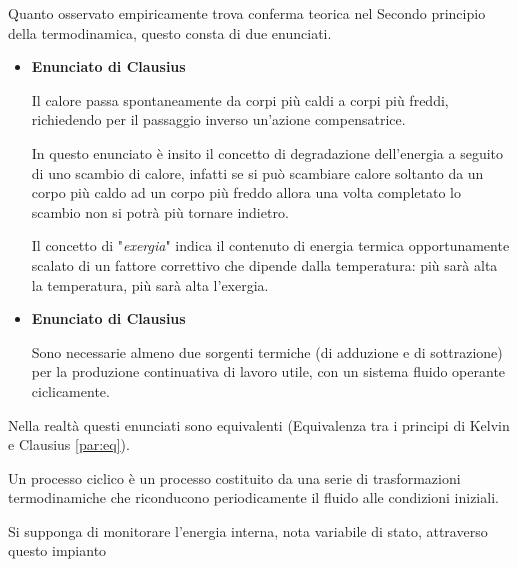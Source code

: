 \begin{adjustwidth}{2in}{}
	Quanto osservato empiricamente trova conferma teorica nel Secondo principio della termodinamica, questo consta di due enunciati. 
	
	\begin{itemize}
		\item \textbf{Enunciato di Clausius}
		\begin{en}
			Il calore passa spontaneamente da corpi più caldi a corpi più freddi, richiedendo per il passaggio inverso un'azione compensatrice.
		\end{en} 		
		In questo enunciato  è insito il concetto di degradazione dell'energia a seguito di uno scambio di calore, infatti se si può scambiare calore soltanto da un corpo più caldo ad un corpo più freddo allora una volta completato lo scambio non si potrà più tornare indietro. 
		
		Il concetto di "\textit{exergia}" indica il contenuto di energia termica  opportunamente scalato di un fattore correttivo che dipende dalla temperatura:  più sarà alta la temperatura, più sarà alta l'exergia. 
		
		\item \textbf{Enunciato di Clausius}\\
		\begin{en}
			Sono necessarie almeno due sorgenti termiche (di adduzione e di sottrazione) per la produzione continuativa di lavoro utile, con un sistema fluido operante ciclicamente.
		\end{en}		
	\end{itemize}
	
	Nella realtà questi enunciati sono equivalenti ({\footnotesize Equivalenza tra i principi di Kelvin e Clausius} \ref{par:eq}). \newline
	
	Un processo ciclico è un processo costituito da una serie di trasformazioni termodinamiche che riconducono periodicamente il fluido alle condizioni iniziali.
	
	\newpage
	
	Si supponga di monitorare l'energia interna, nota variabile di stato, attraverso questo impianto
	
	\vspace{0.5cm}
	

\end{adjustwidth}
